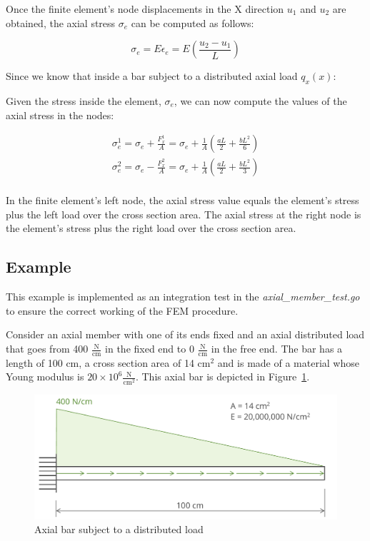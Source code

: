 Once the finite element's node displacements in the X direction $u_1$ and $u_2$ are obtained, the axial stress $\sigma_e$ can be computed as follows:

\[
  \sigma_e = E \epsilon_e = E \left( \frac{u_2 - u_1}{L} \right)
\]

Since we know that inside a bar subject to a distributed axial load $q_x(x)$:

Given the stress inside the element, $\sigma_e$, we can now compute the values of the axial stress in the nodes:

\[
  \begin{split}
    \sigma_e^1 = \sigma_e + \frac{F_x^1}{A} = \sigma_e + \frac{1}{A} \left( \frac{a L}{2} + \frac{b L^2}{6} \right) \\
    \sigma_e^2 = \sigma_e - \frac{F_x^2}{A} = \sigma_e + \frac{1}{A} \left( \frac{a L}{2} + \frac{b L^2}{3} \right) \\
  \end{split}
\]

In the finite element's left node, the axial stress value equals the element's stress plus the left load over the cross section area.
The axial stress at the right node is the element's stress plus the right load over the cross section area.


\subsection{Example}

This example is implemented as an integration test in the \emph{axial\_member\_test.go} to ensure the correct working of the FEM procedure.

Consider an axial member with one of its ends fixed and an axial distributed load that goes from 400 $\frac{\text{N}}{\text{cm}}$ in the fixed end to 0 $\frac{\text{N}}{\text{cm}}$ in the free end.
The bar has a length of 100 cm, a cross section area of 14 $\text{cm}^2$ and is made of a material whose Young modulus is $20 \times 10^6 \frac{\text{N}}{\text{cm}^2}$.
This axial bar is depicted in Figure~\ref{fig:axial_bar_distributed}.

\begin{figure}[h]
  \label{fig:axial_bar_distributed}
  \includegraphics[width=\linewidth]{sections/img/axial_bar_distributed.pdf}
  \caption{Axial bar subject to a distributed load}
\end{figure}


